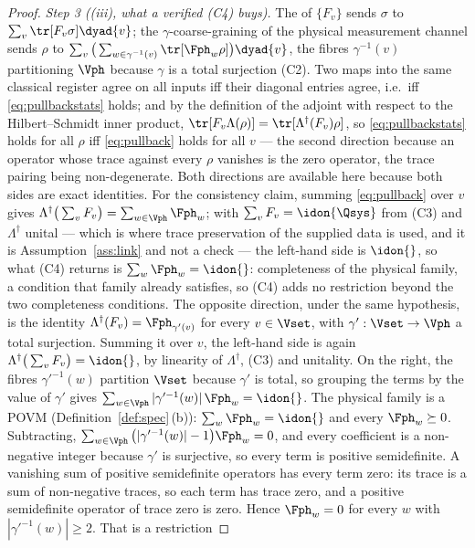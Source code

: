 \begin{proof}
\emph{Step 3 ((iii), what a verified (C4) buys).} The  of
$\{F_v\}$ sends $\sigma$ to $\sum_v\tr[F_v\sigma]\dyad{v}$; the
$\gamma$-coarse-graining of the physical measurement channel sends $\rho$ to
$\sum_v\big(\sum_{w\in\gamma^{-1}(v)}\tr[\Fph_w\rho]\big)\dyad{v}$, the fibres
$\gamma^{-1}(v)$ partitioning $\Vph$ because $\gamma$ is a total surjection
(C2). Two maps into the same classical register agree on all inputs iff their
diagonal entries agree, i.e.\ iff \eqref{eq:pullbackstats} holds; and by the
definition of the adjoint with respect to the Hilbert--Schmidt inner product,
$\tr[F_v\Lambda(\rho)]=\tr[\Lambda^{\dagger}(F_v)\rho]$, so
\eqref{eq:pullbackstats} holds for all $\rho$ iff \eqref{eq:pullback} holds for
all $v$ --- the second direction because an operator whose trace against every
$\rho$ vanishes is the zero operator, the trace pairing being non-degenerate.
Both directions are available here because both sides are exact identities.
For the consistency claim, summing \eqref{eq:pullback} over $v$ gives
$\Lambda^{\dagger}\big(\sum_vF_v\big)=\sum_{w\in\Vph}\Fph_w$; with
$\sum_vF_v=\idon{\Qsys}$ from (C3) and $\Lambda^{\dagger}$ unital --- which is
where trace preservation of the supplied data is used, and it is
Assumption~\ref{ass:link} and not a check --- the left-hand side is
$\idon{}$, so what (C4) returns is $\sum_w\Fph_w=\idon{}$: completeness of the
physical family, a condition that family already satisfies, so (C4) adds no
restriction beyond the two completeness conditions.
The opposite direction, under the same hypothesis, is the identity
$\Lambda^{\dagger}(F_v)=\Fph_{\gamma'(v)}$ for every $v\in\Vset$, with
$\gamma':\Vset\to\Vph$ a total surjection. Summing it over $v$, the left-hand
side is again $\Lambda^{\dagger}\big(\sum_vF_v\big)=\idon{}$, by linearity of
$\Lambda^{\dagger}$, (C3) and unitality. On the right, the fibres
$\gamma'^{-1}(w)$ partition $\Vset$ because $\gamma'$ is total, so grouping
the terms by the value of $\gamma'$ gives
$\sum_{w\in\Vph}|\gamma'^{-1}(w)|\,\Fph_w=\idon{}$. The physical family is a
POVM (Definition~\ref{def:spec}\,(b)): $\sum_w\Fph_w=\idon{}$ and every
$\Fph_w\succeq0$. Subtracting,
$\sum_{w\in\Vph}\big(|\gamma'^{-1}(w)|-1\big)\Fph_w=0$, and every coefficient
is a non-negative integer because $\gamma'$ is surjective, so every term is
positive semidefinite. A vanishing sum of positive semidefinite operators has
every term zero: its trace is a sum of non-negative traces, so each term has
trace zero, and a positive semidefinite operator of trace zero is zero. Hence
$\Fph_w=0$ for every $w$ with $|\gamma'^{-1}(w)|\ge2$. That is a restriction

\end{proof}
